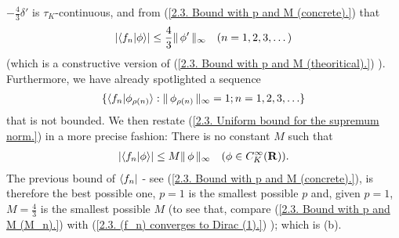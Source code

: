 %
  $\minus \frac{4}{3}\delta'$ is $\tau_K$-continuous,  %
%
and from %
%
  (\ref{2.3. Bound with p and M (concrete).}) %
%
that %
%
  \begin{align}
    \lvert \bra{f_n}\ket{\phi} \rvert \leq \frac{4}{3} \| \,\phi' \, \|_{\infty} 
    \quad (n=1, 2, 3, \dots) 
  \end{align}
%
(which is a constructive version of %
%
  (\ref{2.3. Bound with p and M (theoritical).}) ). %
%
Furthermore, we have already spotlighted a sequence %
%
  \begin{align}
    \set{
      \langle{f_n} \lvert \phi_{\rho(n)} \rangle
    }{
      \norm{\infty}{\phi_{\rho(n)}} = 1; \counting{n}
    }
  \end{align}
%
that is not bounded. We then restate  %
%
  (\ref{2.3. Uniform bound for the supremum norm.}) %
%
in a more precise fashion: %
There is no constant $M$ such that %
%
  \begin{align}
    \lvert \langle f_n \lvert \phi \rangle \rvert \leq 
      M 
    \| \,\phi \, \|_{\infty}
    \quad (\phi\in C_K^\infty({\mathbf R})).
  \end{align}
%
The previous bound of $\bra{f_n}$ %
%
  - see (\ref{2.3. Bound with p and M (concrete).}), 
%
is therefore the best possible one, \ie %
% 
    $p=1$ is the smallest possible $p$ and, given $p=1$,  %
    $M=\frac{4}{3}$ is the smallest possible $M$ %
    (to see that, compare %
      (\ref{2.3. Bound with p and M (M_n).}) with 
      (\ref{2.3. (f_n) converges to Dirac (1).})%
    ); which is (b). %
%
\newline\newline\noindent
%
